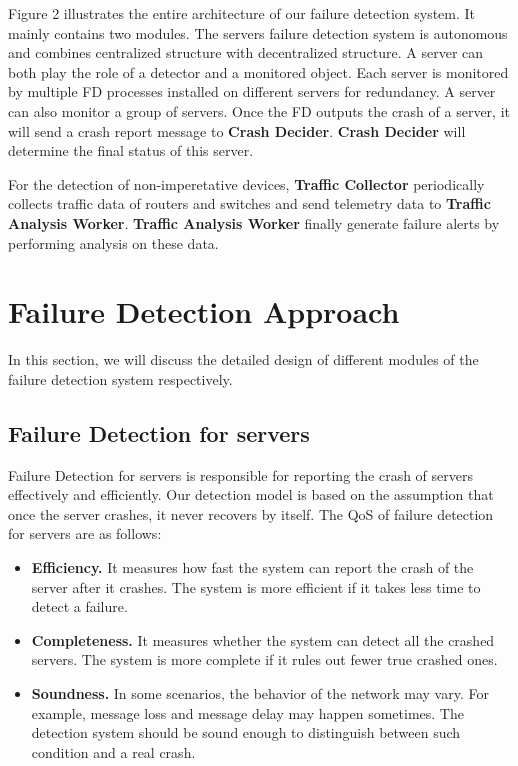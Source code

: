 \documentclass{sig-alternate-05-2015}
\begin{document}
Figure 2 illustrates the entire architecture of our failure detection system. It mainly contains two modules. The servers failure detection system is autonomous and combines centralized structure with decentralized structure. A server can both play the role of a detector and a monitored object. Each server is monitored by multiple FD processes installed on different servers for redundancy. A server can also monitor a group of servers. Once the FD outputs the crash of a server, it will send a crash report message to \textbf{Crash Decider}. \textbf{Crash Decider} will determine the final status of this server.

For the detection of non-imperetative devices, \textbf{Traffic Collector} periodically collects traffic data of routers and switches and send telemetry data to \textbf{Traffic Analysis Worker}. \textbf{Traffic Analysis Worker} finally generate failure alerts by performing analysis on these data.

 

\section{Failure Detection Approach}
In this section, we will discuss the detailed design of different modules of the failure detection system respectively.

\subsection{Failure Detection for servers}
Failure Detection for servers is responsible for reporting the crash of servers effectively and efficiently. Our detection model is based on the assumption that once the server crashes, it never recovers by itself. The QoS of failure detection for servers are as follows:

\begin{itemize}
\item \textbf{Efficiency.} It measures how fast the system can report the crash of the server after it crashes. The system is more efficient if it takes less time to detect a failure.
\item \textbf{Completeness.} It measures whether the system can detect all the crashed servers. The system is more complete if it rules out fewer true crashed ones.
\item \textbf{Soundness.} In some scenarios, the behavior of the network may vary. For example, message loss and message delay may happen sometimes. The detection system should be sound enough to distinguish between such condition and a real crash.

\end{itemize}
\end{document}
